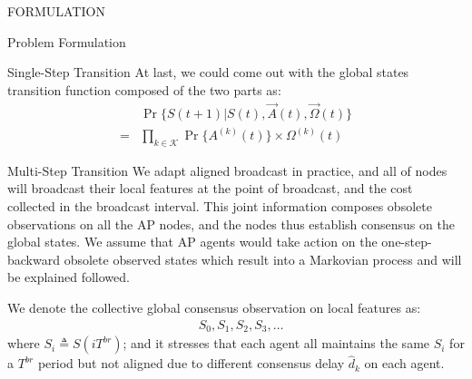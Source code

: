 \documentclass[10pt, conference, letterpaper]{IEEEtran}
\begin{document}
\begin{section}{FORMULATION}
\begin{subsection}{Problem Formulation}
\begin{subsubsection}{Single-Step Transition}
                At last, we could come out with the global states transition function composed of the two parts as:
                \begin{align}
                    & \Pr\{ S(t+1)|S(t), \vec{A}(t), \vec{\Omega}(t)  \}
                    \nonumber\\
                    = & \prod_{k \in \mathcal{K}} \Pr\{ A^{(k)}(t) \} \times \Omega^{(k)}(t)
                \end{align}

            \end{subsubsection}

            \begin{subsubsection}{Multi-Step Transition}
                We adapt aligned broadcast in practice, and all of nodes will broadcast their local features at the point of broadcast, and the cost collected in the broadcast interval.
                This joint information composes obsolete observations on all the AP nodes, and the nodes thus establish consensus on the global states. We assume that AP agents would take action on the one-step-backward obsolete observed states which result into a Markovian process and will be explained followed.

                We denote the collective global consensus observation on local features as:
                \begin{align*}
                    & S_0, S_1, S_2, S_3, \dots
                \end{align*}
                where $S_i \triangleq S(iT^{br})$; and it stresses that each agent all maintains the same $S_i$ for a $T^{br}$ period but not aligned due to different consensus delay $\hat{d}_k$ on each agent.
                

\end{subsubsection}
\end{subsection}
\end{section}
\end{document}

